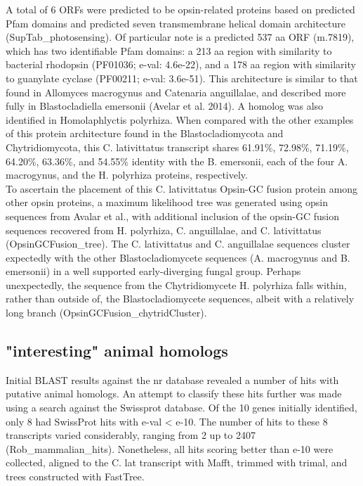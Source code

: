 \indent A total of 6 ORFs were predicted to be opsin-related proteins based on predicted Pfam domains and predicted seven transmembrane helical domain architecture (SupTab\_photosensing). Of particular note is a predicted 537 aa ORF (m.7819), which has two identifiable Pfam domains: a 213 aa region with similarity to bacterial rhodopsin (PF01036; e-val: 4.6e-22), and a 178 aa region with similarity to guanylate cyclase (PF00211; e-val: 3.6e-51). This architecture is similar to that found in Allomyces macrogynus and Catenaria anguillalae, and described more fully in Blastocladiella emersonii (Avelar et al. 2014). A homolog was also identified in Homolaphlyctis polyrhiza. When compared with the other examples of this protein architecture found in the Blastocladiomycota and Chytridiomycota, this C. lativittatus transcript shares 61.91\%, 72.98\%, 71.19\%, 64.20\%, 63.36\%, and 54.55\% identity with the B. emersonii, each of the four A. macrogynus, and the H. polyrhiza proteins, respectively.  \\
\indent To ascertain the placement of this C. lativittatus Opsin-GC fusion protein among other opsin proteins, a maximum likelihood tree was generated using opsin sequences from Avalar et al., with additional inclusion of the opsin-GC fusion sequences recovered from H. polyrhiza, C. anguillalae, and C. lativittatus (OpsinGCFusion\_tree). The C. lativittatus and C. anguillalae sequences cluster expectedly with the other Blastocladiomycete sequences (A. macrogynus and B. emersonii) in a well supported early-diverging fungal group. Perhaps unexpectedly, the sequence from the Chytridiomycete H. polyrhiza falls within, rather than outside of, the Blastocladiomycete sequences, albeit with a relatively long branch (OpsinGCFusion\_chytridCluster).\\
\subsection*{"interesting" animal homologs}
Initial BLAST results against the nr database revealed a number of hits with putative animal homologs. An attempt to classify these hits further was made using a search against the Swissprot database. Of the 10 genes initially identified, only 8 had SwissProt hits with e-val < e-10. The number of hits to these 8 transcripts varied considerably, ranging from 2 up to 2407 (Rob\_mammalian\_hits). Nonetheless, all hits scoring better than e-10 were collected, aligned to the C. lat transcript with Mafft, trimmed with trimal, and trees constructed with FastTree.\\

